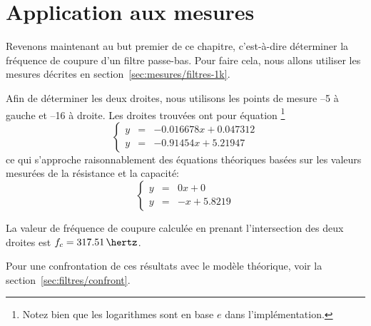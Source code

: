 \section{Application aux mesures}

Revenons maintenant au but premier de ce chapitre,
c'est-à-dire déterminer la fréquence de coupure d'un filtre passe-bas.
Pour faire cela, nous allons utiliser les mesures décrites en
section~\ref{sec:mesures/filtres-1k}.

Afin de déterminer les deux droites, nous utilisons les points de mesure
--5 à gauche et --16 à droite.
Les droites trouvées ont pour équation%
\footnote{
    Notez bien que les logarithmes sont en base $e$ dans l'implémentation.
}
\begin{equation}
    \left\{
    \begin{array}{rcl}
        y &=& -0.016678x+0.047312\\
        y &=& -0.91454x+5.21947
    \end{array}
    \right.
\end{equation}
ce qui s'approche raisonnablement des équations théoriques basées sur 
les valeurs mesurées de la résistance et la capacité:
\begin{equation}
    \left\{
    \begin{array}{rcl}
        y &=& 0x+0\\
        y &=& -x+5.8219
    \end{array}
    \right.
\end{equation}

La valeur de fréquence de coupure calculée
en prenant l'intersection des deux droites est $f_c=317.51\,\hertz$.

Pour une confrontation de ces résultats avec le modèle théorique,
voir la section~\ref{sec:filtres/confront}.
